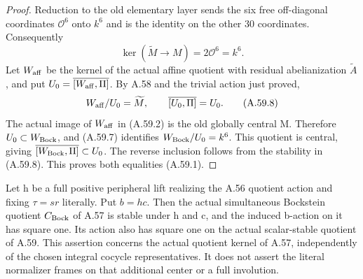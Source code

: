 \begin{proof}
Reduction to the old elementary layer sends the six free
off-diagonal coordinates \(\mathcal O^6\) onto \(k^6\) and
is the identity on the other 30 coordinates. Consequently
\[
 \ker(\widetilde M\to M)=2\mathcal O^6=k^6.
 \tag{A.59.7}
\]
Let \(W_{\rm aff}\) be the kernel of the actual affine quotient
with residual abelianization \(\widetilde A\), and put
\(U_0=\overline{[W_{\rm aff},\Pi]}\). By A.58 and the trivial
action just proved,
\[
 W_{\rm aff}/U_0=\widetilde M,
 \qquad \overline{[U_0,\Pi]}=U_0.
 \tag{A.59.8}
\]
The actual image of \(W_{\rm aff}\) in (A.59.2) is the old
globally central M. Therefore \(U_0\subset W_{\rm Bock}\),
and (A.59.7) identifies
\(W_{\rm Bock}/U_0=k^6\). This quotient is central, giving
\(\overline{[W_{\rm Bock},\Pi]}\subset U_0\). The reverse
inclusion follows from the stability in (A.59.8). This proves
both equalities (A.59.1).
\end{proof}


Let h be a full positive peripheral lift realizing the A.56
quotient action and fixing \(\tau=sr\) literally. Put \(b=hc\).
Then the actual simultaneous Bockstein quotient
\(C_{\rm Bock}\) of A.57 is stable under h and c, and the
induced b-action on it has square one. Its action also has square
one on the actual scalar-stable quotient of A.59. This assertion concerns
the actual quotient kernel of A.57, independently of the chosen
integral cocycle representatives. It does not assert the literal
normalizer frames on that additional center or a full involution.

